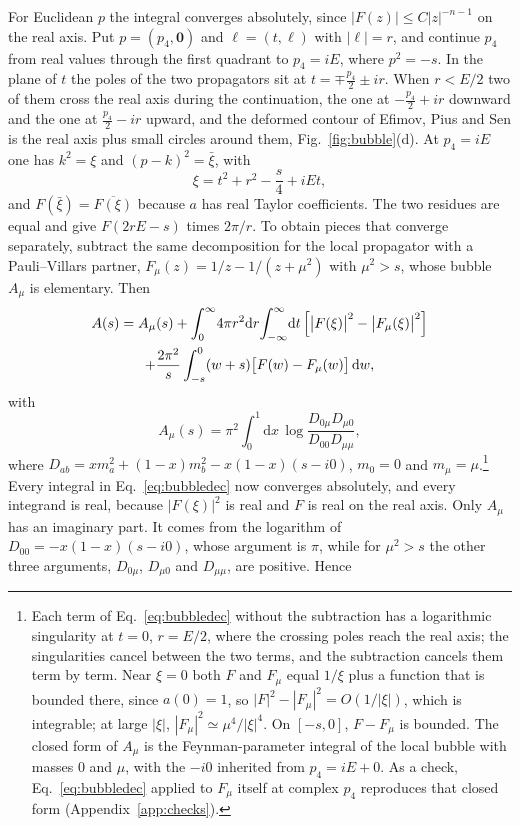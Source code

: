\documentclass[aps,prd,10pt,twocolumn,superscriptaddress,nofootinbib,floatfix,longbibliography]{revtex4-2}
\newcommand{\dd}{\mathrm{d}}
\begin{document}
For Euclidean $p$ the integral converges absolutely, since $|F(z)|\le C|z|^{-n-1}$ on the real axis. Put $p=(p_4,\mathbf 0)$ and $\ell=(t,\boldsymbol\ell)$ with $|\boldsymbol\ell|=r$, and continue $p_4$ from real values through the first quadrant to $p_4=iE$, where $p^2=-s$. In the plane of $t$ the poles of the two propagators sit at $t=\mp\frac{p_4}2\pm ir$. When $r<E/2$ two of them cross the real axis during the continuation, the one at $-\frac{p_4}2+ir$ downward and the one at $\frac{p_4}2-ir$ upward, and the deformed contour of Efimov, Pius and Sen is the real axis plus small circles around them, Fig.~\ref{fig:bubble}(d). At $p_4=iE$ one has $k^2=\xi$ and $(p-k)^2=\bar\xi$, with
\[
\xi=t^2+r^2-\frac s4+iEt ,
\]
and $F(\bar\xi)=\overline{F(\xi)}$ because $a$ has real Taylor coefficients. The two residues are equal and give $F(2rE-s)$ times $2\pi/r$. To obtain pieces that converge separately, subtract the same decomposition for the local propagator with a Pauli--Villars partner, $F_\mu(z)=1/z-1/(z+\mu^2)$ with $\mu^2>s$, whose bubble $A_\mu$ is elementary. Then
\begin{multline}
\label{eq:bubbledec}
A(s)=A_\mu(s)+\int_0^\infty\!4\pi r^2\dd r\!\int_{-\infty}^{\infty}\!\dd t\,\Bigl[\bigl|F(\xi)\bigr|^2-\bigl|F_\mu(\xi)\bigr|^2\Bigr]\\
+\frac{2\pi^2}{s}\int_{-s}^0(w+s)\bigl[F(w)-F_\mu(w)\bigr]\,\dd w ,
\end{multline}
with
\[
A_\mu(s)=\pi^2\!\int_0^1\!\dd x\,\log\frac{D_{0\mu}D_{\mu0}}{D_{00}D_{\mu\mu}},
\]
where $D_{ab}=xm_a^2+(1-x)m_b^2-x(1-x)(s-i0)$, $m_0=0$ and $m_\mu=\mu$.\footnote{Each term of Eq.~\eqref{eq:bubbledec} without the subtraction has a logarithmic singularity at $t=0$, $r=E/2$, where the crossing poles reach the real axis; the singularities cancel between the two terms, and the subtraction cancels them term by term. Near $\xi=0$ both $F$ and $F_\mu$ equal $1/\xi$ plus a function that is bounded there, since $a(0)=1$, so $|F|^2-|F_\mu|^2=O(1/|\xi|)$, which is integrable; at large $|\xi|$, $|F_\mu|^2\simeq\mu^4/|\xi|^4$. On $[-s,0]$, $F-F_\mu$ is bounded. The closed form of $A_\mu$ is the Feynman-parameter integral of the local bubble with masses $0$ and $\mu$, with the $-i0$ inherited from $p_4=iE+0$. As a check, Eq.~\eqref{eq:bubbledec} applied to $F_\mu$ itself at complex $p_4$ reproduces that closed form (Appendix~\ref{app:checks}).} Every integral in Eq.~\eqref{eq:bubbledec} now converges absolutely, and every integrand is real, because $|F(\xi)|^2$ is real and $F$ is real on the real axis. Only $A_\mu$ has an imaginary part. It comes from the logarithm of $D_{00}=-x(1-x)(s-i0)$, whose argument is $\pi$, while for $\mu^2>s$ the other three arguments, $D_{0\mu}$, $D_{\mu0}$ and $D_{\mu\mu}$, are positive. Hence
\end{document}
